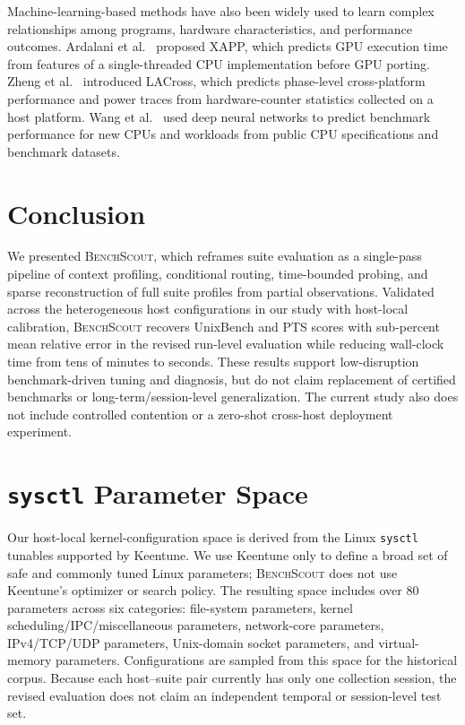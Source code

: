 \documentclass[sigplan,10pt]{acmart}
\newcommand{\ourmethod}{\textsc{BenchScout}\xspace}
\newcommand{\sysctl}[1]{\texttt{\nolinkurl{#1}}}
\begin{document}
Machine-learning-based methods have also been widely used to learn complex relationships among programs, hardware characteristics, and performance outcomes. 
Ardalani et al.~\cite{ardalani2015cross} proposed XAPP, which predicts GPU execution time from features of a single-threaded CPU implementation before GPU porting. 
Zheng et al.~\cite{zheng2016accurate} introduced LACross, which predicts phase-level cross-platform performance and power traces from hardware-counter statistics collected on a host platform. 
Wang et al.~\cite{wang2019predicting} used deep neural networks to predict benchmark performance for new CPUs and workloads from public CPU specifications and benchmark datasets. 

\section{Conclusion}

We presented \ourmethod{}, which reframes suite evaluation as a single-pass pipeline of context profiling, conditional routing, time-bounded probing, and sparse reconstruction of full suite profiles from partial observations.
Validated across the heterogeneous host configurations in our study with host-local calibration, \ourmethod{} recovers UnixBench and PTS scores with sub-percent mean relative error in the revised run-level evaluation while reducing wall-clock time from tens of minutes to seconds.
These results support low-disruption benchmark-driven tuning and diagnosis, but do not claim replacement of certified benchmarks or long-term/session-level generalization.  The current study also does not include controlled contention or a zero-shot cross-host deployment experiment.


\clearpage


\clearpage
\appendix
\section{\texttt{sysctl} Parameter Space}
\label{app:sysctl-space}

Our host-local kernel-configuration space is derived from the Linux \sysctl{sysctl} tunables supported by Keentune.
We use Keentune only to define a broad set of safe and commonly tuned Linux parameters; \ourmethod{} does not use Keentune's optimizer or search policy.
The resulting space includes over 80 parameters across six categories: file-system parameters, kernel scheduling/IPC/miscellaneous parameters, network-core parameters, IPv4/TCP/UDP parameters, Unix-domain socket parameters, and virtual-memory parameters.
Configurations are sampled from this space for the historical corpus.  Because each host--suite pair currently has only one collection session, the revised evaluation does not claim an independent temporal or session-level test set.
\end{document}
